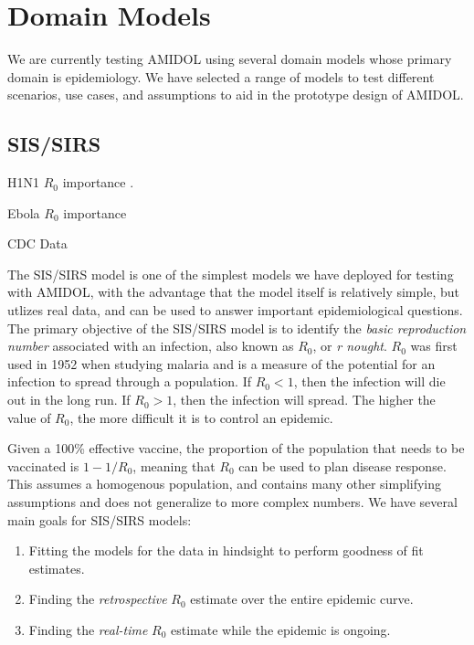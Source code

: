 \documentclass[11pt]{article}
\newcommand{\amidol}{\textsc{AMIDOL}}
\begin{document}
\section{Domain Models}

We are currently testing \amidol{} using several domain models whose primary domain is epidemiology.  We have selected a range of models to test different scenarios, use cases, and assumptions to aid in the prototype design of \amidol{}.

\subsection{SIS/SIRS}

H1N1 $R_0$ importance \cite{fraser2009pandemic}.

Ebola $R_0$ importance \cite{fisman2014early}

CDC Data \cite{cdc2019fluview}

The SIS/SIRS model is one of the simplest models we have deployed for testing with \amidol{}, with the advantage that the model itself is relatively simple, but utlizes real data, and can be used to answer important epidemiological questions.  The primary objective of the SIS/SIRS model is to identify the \emph{basic reproduction number} associated with an infection, also known as $R_0$, or \emph{r nought}.  $R_0$ was first used in 1952 when studying malaria and is a measure of the potential for an infection to spread through a population.  If $R_0 < 1$, then the infection will die out in the long run.  If $R_0 > 1$, then the infection will spread.  The higher the value of $R_0$, the more difficult it is to control an epidemic.

Given a 100\% effective vaccine, the proportion of the population that needs to be vaccinated is $1 - 1/R_0$, meaning that $R_0$ can be used to plan disease response.  This assumes a homogenous population, and contains many other simplifying assumptions and does not generalize to more complex numbers.  We have several main goals for SIS/SIRS models:

\begin{enumerate}
\item Fitting the models for the data in hindsight to perform goodness of fit estimates.
\item Finding the \emph{retrospective} $R_0$ estimate over the entire epidemic curve.
\item Finding the \emph{real-time} $R_0$ estimate while the epidemic is ongoing.
\end{enumerate}
\end{document}
